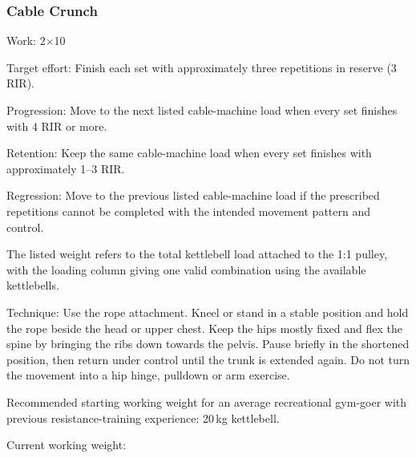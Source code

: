 \documentclass[11pt,a4paper]{article}
\begin{document}
\newpage
\subsubsection{Cable Crunch}

Work: 2$\times$10

Target effort: Finish each set with approximately three repetitions in reserve (3 RIR).

Progression: Move to the next listed cable-machine load when every set finishes with 4 RIR or more.

Retention: Keep the same cable-machine load when every set finishes with approximately 1--3 RIR.

Regression: Move to the previous listed cable-machine load if the prescribed repetitions cannot be completed with the intended movement pattern and control.

The listed weight refers to the total kettlebell load attached to the 1:1 pulley, with the loading column giving one valid combination using the available kettlebells.

Technique: Use the rope attachment. Kneel or stand in a stable position and hold the rope beside the head or upper chest. Keep the hips mostly fixed and flex the spine by bringing the ribs down towards the pelvis. Pause briefly in the shortened position, then return under control until the trunk is extended again. Do not turn the movement into a hip hinge, pulldown or arm exercise.

Recommended starting working weight for an average recreational gym-goer with previous resistance-training experience: 20\,kg kettlebell.

Current working weight:
\end{document}
